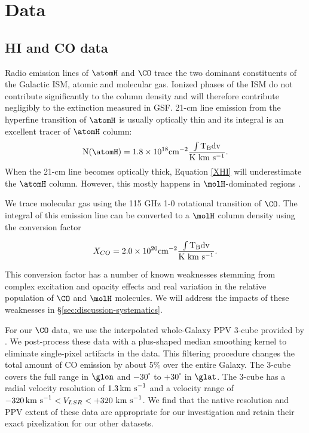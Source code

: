 \section{Data}
\label{sec:data}
\subsection{HI and CO data}

Radio emission lines of $\atomH$ and $\CO$ trace the two dominant constituents of the Galactic ISM, atomic and molecular gas. 
Ionized phases of the ISM do not contribute significantly to the column density and will therefore contribute negligibly to the extinction measured in GSF. 
21-cm line emission from the hyperfine transition of $\atomH$ is usually optically thin and its integral is an excellent tracer of $\atomH$ column:
\begin{equation}\label{XHI}
{\rm N(\atomH)} = 1.8 \times 10^{18} \rm cm^{-2} \frac{ \int T_B dv}{\rm K~km~s^{-1}}.
\end{equation}
When the 21-cm line becomes optically thick, Equation \ref{XHI} will underestimate the $\atomH$ column. 
However, this mostly happens in $\molH$-dominated regions \citep{Goldsmith_2007}.

We trace molecular gas using the 115 GHz 1-0 rotational transition of $\CO$. 
The integral of this emission line can be converted to a $\molH$ column density using the conversion factor \citep{Bolatto_2013}

\begin{equation}\label{XCO}
X_{CO} = 2.0 \times 10^{20} \rm cm^{-2} \frac{ \int T_B dv}{\rm K~km~s^{-1}}.
\end{equation}

This conversion factor has a number of known weaknesses stemming from complex excitation and opacity effects and real variation in the relative population of $\CO$ and $\molH$ molecules. 
We will address the impacts of these weaknesses in \S \ref{sec:discussion-systematics}. 

For our $\CO$ data, we use the interpolated whole-Galaxy PPV 3-cube provided by \citet{Dame_2001}. 
We post-process these data with a plus-shaped median smoothing kernel to eliminate single-pixel artifacts in the data. 
This filtering procedure changes the total amount of CO emission by about 5\% over the entire Galaxy. 
The 3-cube covers the full range in $\glon$ and $-30^\circ$ to $+30^\circ$ in $\glat$. 
The 3-cube has a radial velocity resolution of $1.3 {\rm \, km~s}^{-1}$ and a velocity range of $-320{\rm \,km~s} ^{-1} < V_{LSR} < +320 \rm{~km~s}^{-1}$. 
We find that the native resolution and PPV extent of these data are appropriate for our investigation and retain their exact pixelization for our other datasets.

